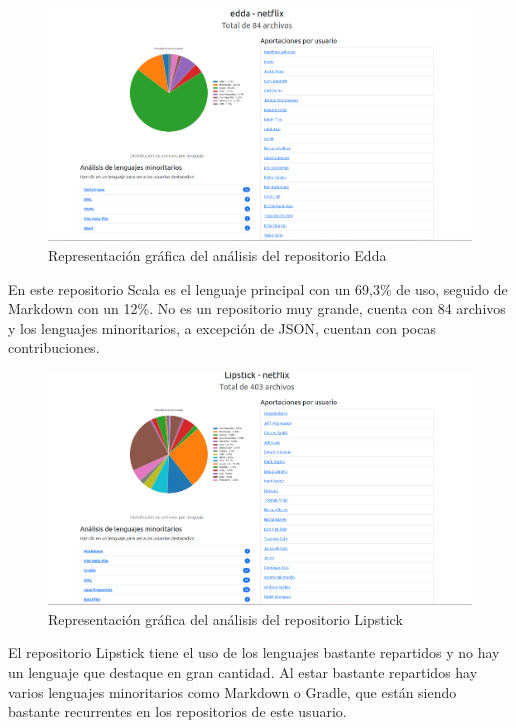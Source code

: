 \documentclass[a4paper, 12pt]{book}
\begin{document}
\begin{figure}[H]
  \centering
  \includegraphics[width=1\textwidth]{img/edda.png}
  \caption{Representación gráfica del análisis del repositorio Edda}
  \label{figura:analisisedda}
\end{figure}

En este repositorio Scala es el lenguaje principal con un 69,3\% de uso, seguido de Markdown con un 12\%. No es un repositorio muy grande, cuenta con 84 archivos y los lenguajes minoritarios, a excepción de JSON, cuentan con pocas contribuciones.

\begin{figure}[H]
  \centering
  \includegraphics[width=1\textwidth]{img/lipstick.png}
  \caption{Representación gráfica del análisis del repositorio Lipstick}
  \label{figura:analisislipstick}
\end{figure}

El repositorio Lipstick tiene el uso de los lenguajes bastante repartidos y no hay un lenguaje que destaque en gran cantidad. Al estar bastante repartidos hay varios lenguajes minoritarios como Markdown o Gradle, que están siendo bastante recurrentes en los repositorios de este usuario.
\end{document}
